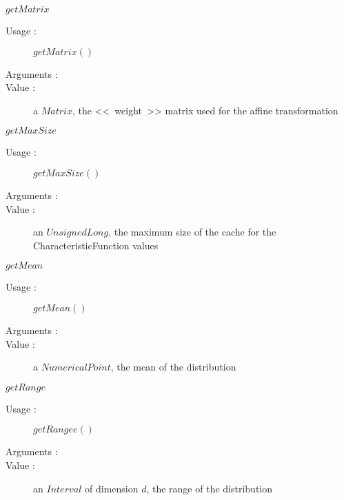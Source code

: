 \begin{description}
\begin{description}
  \item $getMatrix$
    \begin{description}
    \item[Usage :]  $getMatrix()$
    \item[Arguments :]  \strut
    \item[Value :] a $Matrix$, the <<~weight~>> matrix used for the affine transformation
    \end{description}

  \item $getMaxSize$
    \begin{description}
    \item[Usage :]  $getMaxSize()$
    \item[Arguments :]  \strut
    \item[Value :] an $UnsignedLong$, the maximum size of the cache for the CharacteristicFunction values
    \end{description}

  \item $getMean$
    \begin{description}
    \item[Usage :]  $getMean()$
    \item[Arguments :]  \strut
    \item[Value :] a $NumericalPoint$, the mean of the distribution
    \end{description}

  \item $getRange$
    \begin{description}
    \item[Usage :]  $getRangee()$
    \item[Arguments :]  \strut
    \item[Value :] an $Interval$ of dimension $d$, the range of the distribution
    \end{description}


\end{description}
\end{description}
